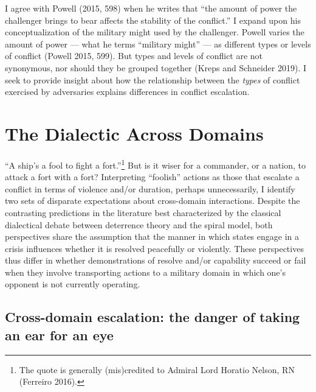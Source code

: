 \documentclass[
]{article}
\begin{document}
I agree with Powell (2015, 598) when he writes that ``the amount of power the challenger brings to bear affects the stability of the conflict.'' I expand upon his conceptualization of the military might used by the challenger. Powell varies the amount of power --- what he terms ``military might'' --- as different types or levels of conflict (Powell 2015, 599). But types and levels of conflict are not synonymous, nor should they be grouped together (Kreps and Schneider 2019). I seek to provide insight about how the relationship between the \textit{types} of conflict exercised by adversaries explains differences in conflict escalation.

\hypertarget{the-dialectic-across-domains}{%
\section{The Dialectic Across Domains}\label{the-dialectic-across-domains}}

``A ship's a fool to fight a fort.''\footnote{The quote is generally (mis)credited to Admiral Lord Horatio Nelson, RN (Ferreiro 2016).} But is it wiser for a commander, or a nation, to attack a fort with a fort? Interpreting ``foolish'' actions as those that escalate a conflict in terms of violence and/or duration, perhaps unnecessarily, I identify two sets of disparate expectations about cross-domain interactions. Despite the contrasting predictions in the literature best characterized by the classical dialectical debate between deterrence theory and the spiral model, both perspectives share the assumption that the manner in which states engage in a crisis influences whether it is resolved peacefully or violently. These perspectives thus differ in whether demonstrations of resolve and/or capability succeed or fail when they involve transporting actions to a military domain in which one's opponent is not currently operating.

\hypertarget{cross-domain-escalation-the-danger-of-taking-an-ear-for-an-eye}{%
\subsection{Cross-domain escalation: the danger of taking an ear for an eye}\label{cross-domain-escalation-the-danger-of-taking-an-ear-for-an-eye}}
\end{document}
